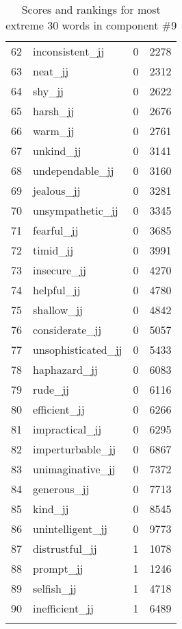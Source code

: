 \begin{longtable}[!htbp]{| rlr@{.}l |}
    62 & inconsistent\_jj & 0 & 2278 \\
    63 & neat\_jj & 0 & 2312 \\
    64 & shy\_jj & 0 & 2622 \\
    65 & harsh\_jj & 0 & 2676 \\
    66 & warm\_jj & 0 & 2761 \\
    67 & unkind\_jj & 0 & 3141 \\
    68 & undependable\_jj & 0 & 3160 \\
    69 & jealous\_jj & 0 & 3281 \\
    70 & unsympathetic\_jj & 0 & 3345 \\
    71 & fearful\_jj & 0 & 3685 \\
    72 & timid\_jj & 0 & 3991 \\
    73 & insecure\_jj & 0 & 4270 \\
    74 & helpful\_jj & 0 & 4780 \\
    75 & shallow\_jj & 0 & 4842 \\
    76 & considerate\_jj & 0 & 5057 \\
    77 & unsophisticated\_jj & 0 & 5433 \\
    78 & haphazard\_jj & 0 & 6083 \\
    79 & rude\_jj & 0 & 6116 \\
    80 & efficient\_jj & 0 & 6266 \\
    81 & impractical\_jj & 0 & 6295 \\
    82 & imperturbable\_jj & 0 & 6867 \\
    83 & unimaginative\_jj & 0 & 7372 \\
    84 & generous\_jj & 0 & 7713 \\
    85 & kind\_jj & 0 & 8545 \\
    86 & unintelligent\_jj & 0 & 9773 \\
    87 & distrustful\_jj & 1 & 1078 \\
    88 & prompt\_jj & 1 & 1246 \\
    89 & selfish\_jj & 1 & 4718 \\
    90 & inefficient\_jj & 1 & 6489 \\
    \hline
    \caption{Scores and rankings for most extreme 30 words in component \#9} \\
\end{longtable}
